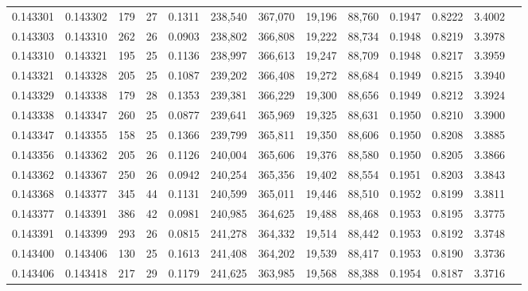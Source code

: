 \begin{tabular}{rrrrrrrrrrrrr}
0.143301 & 0.143302 & 179 &  27 &                                     0.1311 & 238,540 & 367,070 &  19,196 &  88,760 & 0.1947 & 0.8222 & 3.4002 \\
0.143303 & 0.143310 & 262 &  26 &                                     0.0903 & 238,802 & 366,808 &  19,222 &  88,734 & 0.1948 & 0.8219 & 3.3978 \\
0.143310 & 0.143321 & 195 &  25 &                                     0.1136 & 238,997 & 366,613 &  19,247 &  88,709 & 0.1948 & 0.8217 & 3.3959 \\
0.143321 & 0.143328 & 205 &  25 &                                     0.1087 & 239,202 & 366,408 &  19,272 &  88,684 & 0.1949 & 0.8215 & 3.3940 \\
0.143329 & 0.143338 & 179 &  28 &                                     0.1353 & 239,381 & 366,229 &  19,300 &  88,656 & 0.1949 & 0.8212 & 3.3924 \\
0.143338 & 0.143347 & 260 &  25 &                                     0.0877 & 239,641 & 365,969 &  19,325 &  88,631 & 0.1950 & 0.8210 & 3.3900 \\
0.143347 & 0.143355 & 158 &  25 &                                     0.1366 & 239,799 & 365,811 &  19,350 &  88,606 & 0.1950 & 0.8208 & 3.3885 \\
0.143356 & 0.143362 & 205 &  26 &                                     0.1126 & 240,004 & 365,606 &  19,376 &  88,580 & 0.1950 & 0.8205 & 3.3866 \\
0.143362 & 0.143367 & 250 &  26 &                                     0.0942 & 240,254 & 365,356 &  19,402 &  88,554 & 0.1951 & 0.8203 & 3.3843 \\
0.143368 & 0.143377 & 345 &  44 &                                     0.1131 & 240,599 & 365,011 &  19,446 &  88,510 & 0.1952 & 0.8199 & 3.3811 \\
0.143377 & 0.143391 & 386 &  42 &                                     0.0981 & 240,985 & 364,625 &  19,488 &  88,468 & 0.1953 & 0.8195 & 3.3775 \\
0.143391 & 0.143399 & 293 &  26 &                                     0.0815 & 241,278 & 364,332 &  19,514 &  88,442 & 0.1953 & 0.8192 & 3.3748 \\
0.143400 & 0.143406 & 130 &  25 &                                     0.1613 & 241,408 & 364,202 &  19,539 &  88,417 & 0.1953 & 0.8190 & 3.3736 \\
0.143406 & 0.143418 & 217 &  29 &                                     0.1179 & 241,625 & 363,985 &  19,568 &  88,388 & 0.1954 & 0.8187 & 3.3716 \\

\end{tabular}
